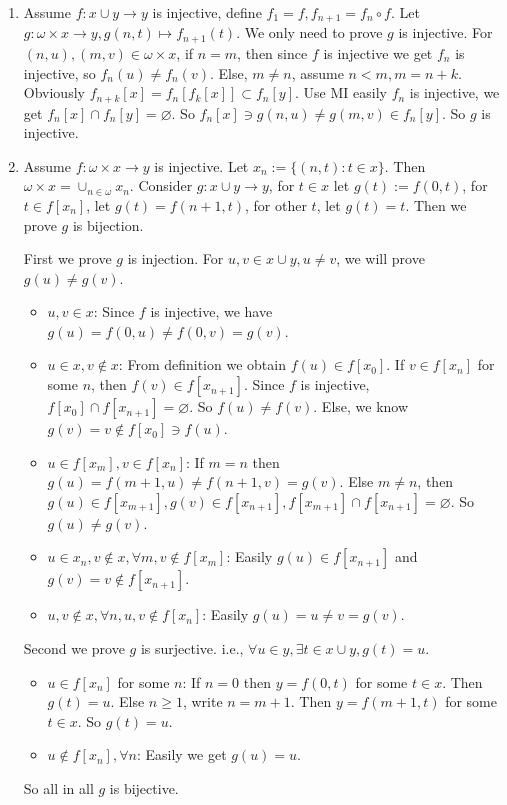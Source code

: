 \documentclass{ctexart}
\begin{document}
\begin{solution}
 \begin{enumerate}
  \item Assume $f:x\cup y\to y$ is injective, define $f_1=f,f_{n+1}=f_n\circ f$. Let $g:\omega\times x\to y,g(n,t)\mapsto f_{n+1}(t)$. We only need to prove $g$ is injective. 
  For $(n,u),(m,v)\in \omega\times x$, if $n=m$, then since $f$ is injective we get $f_n$ is injective, so $f_n(u)\neq f_n(v)$. Else, $m\neq n$, assume $n< m,m=n+k$. Obviously $f_{n+k}[x]=f_n[f_k[x]]\subset f_n[y]$. Use MI easily $f_n$ is injective, we get $f_n[x]\cap f_n[y]=\varnothing$. So $f_n[x]\ni g(n,u)\neq g(m,v)\in f_n[y]$. So $g$ is injective. 
  \item Assume $f:\omega\times x\to y$ is injective. Let $x_n:=\{(n,t):t\in x\}$. Then $\omega\times x=\cup_{n\in \omega}x_n$. Consider $g:x\cup y\to y$, for $t\in x$ let $g(t):=f(0,t)$, for $t\in f[x_n]$, let $g(t)=f(n+1,t)$, for other $t$, let $g(t)=t$. Then we prove $g$ is bijection. 
  
  First we prove $g$ is injection. For $u,v\in x\cup y,u\neq v$, we will prove $g(u)\neq g(v)$. 
  \begin{itemize}
   \item $u,v\in x$: Since $f$ is injective, we have $g(u)=f(0,u)\neq f(0,v)=g(v)$. 
   \item $u\in x,v\notin x$: From definition we obtain $f(u)\in f[x_0]$. If $v\in f[x_n]$ for some $n$, then $f(v)\in f[x_{n+1}]$. Since $f$ is injective, $f[x_0]\cap f[x_{n+1}]=\varnothing$. So $f(u)\neq f(v)$. Else, we know $g(v)=v\notin f[x_0]\ni f(u)$. 
   \item $u\in f[x_m],v\in f[x_n]$: If $m=n$ then $g(u)=f(m+1,u)\neq f(n+1,v)=g(v)$. Else $m\neq n$, then $g(u)\in f[x_{m+1}],g(v)\in f[x_{n+1}],f[x_{m+1}]\cap f[x_{n+1}]=\varnothing$. So $g(u)\neq g(v)$. 
   \item $u\in x_n,v\notin x,\forall m, v\notin f[x_m]$: Easily $g(u)\in f[x_{n+1}]$ and $g(v)=v\notin f[x_{n+1}]$. 
   \item $u,v\notin x,\forall n,u,v\notin f[x_n]$: Easily $g(u)=u\neq v=g(v)$. 
  \end{itemize}
  Second we prove $g$ is surjective. i.e., $\forall u\in y,\exists t\in x\cup y,g(t)=u$. 
  \begin{itemize}
   \item $u\in f[x_n]$ for some $n$: If $n=0$ then $y=f(0,t)$ for some $t\in x$. Then $g(t)=u$. Else $n\geq 1$, write $n=m+1$. Then $y=f(m+1,t)$ for some $t\in x$. So $g(t)=u$. 
   \item $u\notin f[x_n],\forall n$: Easily we get $g(u)=u$.  
  \end{itemize}
  So all in all $g$ is bijective. 
 \end{enumerate}
\end{solution}
\end{document}
